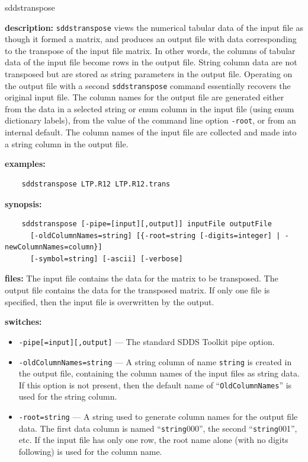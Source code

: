 \begin{sddsprog}{sddstranspose}
  \item \textbf{description:} \verb|sddstranspose| views the numerical tabular data of the input file as though it formed a matrix, and produces an output file with data corresponding to the transpose of the input file matrix. In other words, the columns of tabular data of the input file become rows in the output file. String column data are not transposed but are stored as string parameters in the output file. Operating on the output file with a second \verb|sddstranspose| command essentially recovers the original input file. The column names for the output file are generated either from the data in a selected string or enum column in the input file (using enum dictionary labels), from the value of the command line option \verb|-root|, or from an internal default. The column names of the input file are collected and made into a string column in the output file.
  \item \textbf{examples:}
    \begin{verbatim}
    sddstranspose LTP.R12 LTP.R12.trans
    \end{verbatim}
  \item \textbf{synopsis:}
    \begin{verbatim}
    sddstranspose [-pipe=[input][,output]] inputFile outputFile
      [-oldColumnNames=string] [{-root=string [-digits=integer] | -newColumnNames=column}]
      [-symbol=string] [-ascii] [-verbose]
    \end{verbatim}
  \item \textbf{files:} The input file contains the data for the matrix to be transposed. The output file contains the data for the transposed matrix. If only one file is specified, then the input file is overwritten by the output.
  \item \textbf{switches:}
    \begin{itemize}
      \item \verb|-pipe[=input][,output]| --- The standard SDDS Toolkit pipe option.
      \item \verb|-oldColumnNames=string| --- A string column of name \verb|string| is created in the output file, containing the column names of the input files as string data. If this option is not present, then the default name of ``\verb|OldColumnNames|'' is used for the string column.
      \item \verb|-root=string| --- A string used to generate column names for the output file data. The first data column is named ``\verb|string|000'', the second ``\verb|string|001'', etc. If the input file has only one row, the root name alone (with no digits following) is used for the column name.

\end{itemize}
\end{sddsprog}
